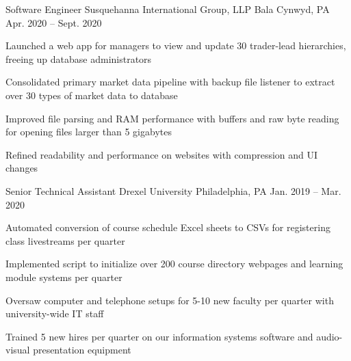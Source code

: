 

\begin{cventries}

  \cventry
  {Software Engineer} %
  {Susquehanna International Group, LLP} %
  {Bala Cynwyd, PA} %
  {Apr. 2020 -- Sept. 2020} %
  {
    \begin{cvitems} %
      \item {Launched a web app for managers to view and update 30 trader-lead hierarchies, freeing up database administrators}
      \item {Consolidated primary market data pipeline with backup file listener to extract over 30 types of market data to database}
      \item {Improved file parsing and RAM performance with buffers and raw byte reading for opening files larger than 5 gigabytes}
      \item {Refined readability and performance on websites with compression and UI changes}
    \end{cvitems}
  }

  \cventry
  {Senior Technical Assistant} %
  {Drexel University} %
  {Philadelphia, PA} %
  {Jan. 2019 -- Mar. 2020} %
  {
    \begin{cvitems} %
      \item {Automated conversion of course schedule Excel sheets to CSVs for registering class livestreams per quarter}
      \item {Implemented script to initialize over 200 course directory webpages and learning module systems per quarter}
      \item {Oversaw computer and telephone setups for 5-10 new faculty per quarter with university-wide IT staff}
      \item {Trained 5 new hires per quarter on our information systems software and audio-visual presentation equipment}
    \end{cvitems}
  }

\end{cventries}
